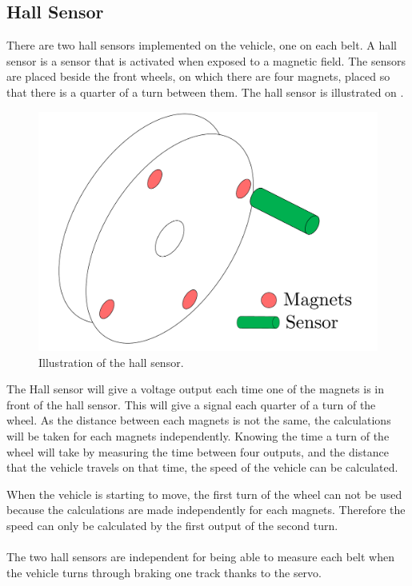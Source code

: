 \subsection{Hall Sensor}

There are two hall sensors implemented on the vehicle, one on each belt. A hall sensor is a sensor that is activated when exposed to a magnetic field. The sensors are placed beside the front wheels, on which there are four magnets, placed so that there is a quarter of a turn between them. The hall sensor is illustrated on .

 \begin{figure}[H]
	\centering
	\includegraphics[scale=0.5]{figures/HallSensorSide_Forward_view.pdf}
	\caption{Illustration of the hall sensor.}
	\label{HallSensor}
\end{figure}

The Hall sensor will give a voltage output each time one of the magnets is in front of the hall sensor. This will give a signal each quarter of a turn of the wheel. As the distance between each magnets is not the same, the calculations will be taken for each magnets independently.
Knowing the time a turn of the wheel will take by measuring the time between four outputs, and the distance that the vehicle travels on that time, the speed of the vehicle can be calculated.

When the vehicle is starting to move, the first turn of the wheel can not be used because the calculations are made independently for each magnets. Therefore the speed can only be calculated by the first output of the second turn.\\\\


The two hall sensors are independent for being able to measure each belt when the vehicle turns through braking one track thanks to the servo.